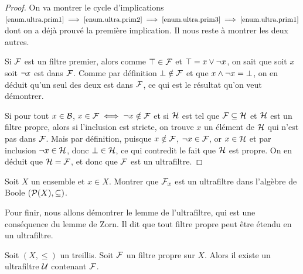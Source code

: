 \begin{proof}
  On va montrer le cycle d'implications
  $\ref{enum.ultra.prim1} \implies\ref{enum.ultra.prim2}
  \implies\ref{enum.ultra.prim3}\implies\ref{enum.ultra.prim1}$
  dont on a déjà prouvé la première implication. Il nous reste à montrer les
  deux autres.
  
  Si $\mathcal{F}$ est un filtre premier, alors comme $\top \in \mathcal{F}$ et
  $\top = x \vee \lnot x$, on sait que soit $x$ soit $\lnot x$ est dans
  $\mathcal{F}$. Comme par définition $\bot\notin\mathcal{F}$ et que
  $x\wedge\lnot x = \bot$, on en déduit qu'un seul des deux est dans
  $\mathcal{F}$, ce qui est le résultat qu'on veut démontrer.

  Si pour tout $x\in \mathcal{B}$, $x\in\mathcal{F}\iff\lnot x\notin\mathcal{F}$ et
  si $\mathcal{H}$ est tel que $\mathcal{F}\subseteq\mathcal{H}$ et $\mathcal{H}$
  est un filtre propre, alors si l'inclusion est stricte, on trouve $x$ un
  élément de $\mathcal{H}$ qui n'est pas dans $\mathcal{F}$. Mais par définition,
  puisque $x\notin\mathcal{F}$, $\lnot x\in\mathcal{F}$, or $x\in \mathcal{H}$ et
  par inclusion $\lnot x \in \mathcal{H}$, donc $\bot\in \mathcal{H}$, ce qui
  contredit le fait que $\mathcal{H}$ est propre. On en déduit que
  $\mathcal{H} = \mathcal{F}$, et donc que $\mathcal{F}$ est un ultrafiltre.
\end{proof}

\begin{exercise}
  Soit $X$ un ensemble et $x\in X$. Montrer que $\mathcal{F}_{x}$ est un
  ultrafiltre dans l'algèbre de Boole $(\mathcal{P}(X),\subseteq)$.
\end{exercise}

Pour finir, nous allons démontrer le lemme de l'ultrafiltre, qui est une
conséquence du lemme de Zorn. Il dit que tout filtre propre peut être
étendu en un ultrafiltre.

\begin{theorem}\label{thm.ultrafilter.lemma}
  Soit $(X,\leq)$ un treillis. Soit $\mathcal{F}$ un filtre propre sur $X$. Alors il
  existe un ultrafiltre $\mathcal{U}$ contenant $\mathcal{F}$.
\end{theorem}

